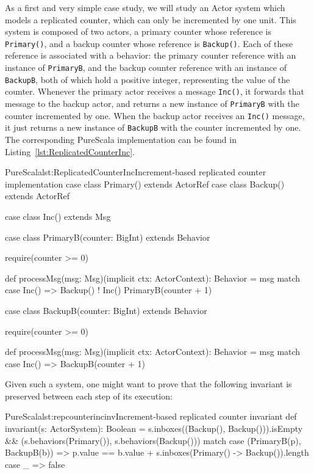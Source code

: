 \documentclass[a4paper,twoside]{article}
\newcommand{\RefCode}[1]{Listing~\ref{#1}}
\newcommand{\stt}[1]{\texttt{\small{#1}}}
\begin{document}
As a first and very simple case study, we will study an Actor system which models a
replicated counter, which can only be incremented by one unit. This system is 
composed of two actors, a primary counter whose reference is \stt{Primary()},
and a backup counter whose reference is \stt{Backup()}.
Each of these reference is associated with a behavior: the primary counter reference with
an instance of \stt{PrimaryB}, and the backup counter reference with an instance 
of \stt{BackupB}, both of which hold a positive integer, representing the value of the
counter. Whenever the primary actor receives a message \stt{Inc()}, it forwards that
message to the backup actor, and returns a new instance of \stt{PrimaryB} with the
counter incremented by one. When the backup actor receives an \stt{Inc()} message,
it just returns a new instance of \stt{BackupB} with the counter incremented by one. 
The corresponding PureScala implementation can be found
in \RefCode{lst:ReplicatedCounterInc}.

\begin{Code}{PureScala}{lst:ReplicatedCounterInc}{Increment-based replicated counter implementation}
case class Primary() extends ActorRef
case class Backup()  extends ActorRef

case class Inc() extends Msg

case class PrimaryB(counter: BigInt) extends Behavior {
  require(counter >= 0)

  def processMsg(msg: Msg)(implicit ctx: ActorContext): Behavior = msg match {
    case Inc() =>
      Backup() ! Inc()
      PrimaryB(counter + 1)
  }
}

case class BackupB(counter: BigInt) extends Behavior {
  require(counter >= 0)

  def processMsg(msg: Msg)(implicit ctx: ActorContext): Behavior = msg match {
    case Inc() => BackupB(counter + 1)
  }
}
\end{Code}

Given such a system, one might want to prove that the following invariant is 
preserved between each step of its execution:

\begin{Code}{PureScala}{lst:repcounterincinv}{Increment-based replicated counter invariant}
def invariant(s: ActorSystem): Boolean = {
  s.inboxes((Backup(), Backup())).isEmpty && {
    (s.behaviors(Primary()), s.behaviors(Backup())) match {
      case (PrimaryB(p), BackupB(b)) =>
        p.value == b.value + s.inboxes(Primary() -> Backup()).length
      case _ => false
    }	
  }
}
\end{Code}
\end{document}
